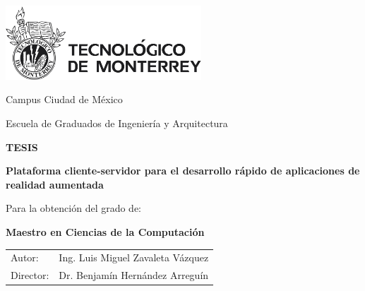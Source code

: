 \documentclass[12pt,a4paper,spanish,openany]{book}
\begin{document}
\sloppy
\doublespacing

\title{}
\author{LUIS MIGUEL ZAVALETA VÁZQUEZ}
\date{25 de AGOSTO del 2011}


\singlespacing

\begin{titlepage}

\begin{center}



\includegraphics[width=0.55\textwidth]{./img/LogoITESM.jpg}

\vspace{4 mm}
{\large Campus Ciudad de México}

\vspace{3 mm}
{\large Escuela de Graduados de Ingeniería y Arquitectura}

\vspace{25 mm}
\begin{Large}
\textbf{TESIS}
\end{Large} 


\vspace{9 mm}
\begin{LARGE}
{ \bfseries Plataforma cliente-servidor para el desarrollo rápido de
aplicaciones de realidad aumentada}
\end{LARGE}


\vspace{25 mm}
{\large Para la obtención del grado de:}

\vspace{5 mm}
\begin{Large}
\textbf{Maestro en Ciencias de la Computación}
\end{Large}


\vspace{25 mm}

\begin{table}[h]
\begin{center}
\begin{tabular}{l l}

Autor: & Ing. Luis Miguel Zavaleta Vázquez \\

Director: & Dr. Benjamín Hernández Arreguín\\


\end{tabular}
\end{center}
\end{table}
\end{center}
\end{titlepage}
\end{document}
